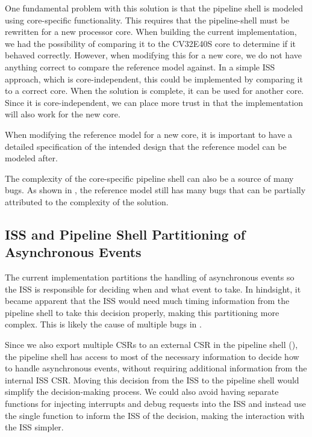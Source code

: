 One fundamental problem with this solution is that the pipeline shell is modeled using core-specific functionality.
This requires that the pipeline-shell must be rewritten for a new processor core.
When building the current implementation, we had the possibility of comparing it to the CV32E40S core to determine if it behaved correctly. However, when modifying this for a new core, we do not have anything correct to compare the reference model against.  
In a simple ISS approach, which is core-independent, this could be implemented by comparing it to a correct core. When the solution is complete, it can be used for another core. Since it is core-independent, we can place more trust in that the implementation will also work for the new core.

When modifying the reference model for a new core, it is important to have a detailed specification of the intended design that the reference model can be modeled after.

The complexity of the core-specific pipeline shell can also be a source of many bugs. As shown in , the reference model still has many bugs that can be partially attributed to the complexity of the solution. 

\subsection{ISS and Pipeline Shell Partitioning of Asynchronous Events}
\label{sec:dis_async_partition}

The current implementation partitions the handling of asynchronous events so the ISS is responsible for deciding when and what event to take. In hindsight, it became apparent that the ISS would need much timing information from the pipeline shell to take this decision properly, making this partitioning more complex. 
This is likely the cause of multiple bugs in . 

Since we also export multiple CSRs to an external CSR in the pipeline shell (), the pipeline shell has access to most of the necessary information to decide how to handle asynchronous events, without requiring additional information from the internal ISS CSR. 
Moving this decision from the ISS to the pipeline shell would simplify the decision-making process. We could also avoid having separate functions for injecting interrupts and debug requests into the ISS and instead use the single  function to inform the ISS of the decision, making the interaction with the ISS simpler.

